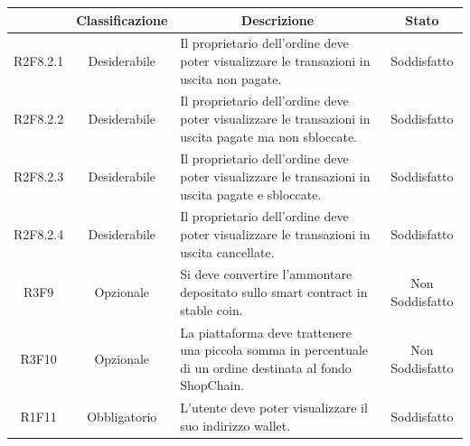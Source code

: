 \begin{table}[H]
    \centering
    \renewcommand{\arraystretch}{1.8}
    \begin{tabular}{c | c | p{6cm} | c}
        \rowcolor[HTML]{125E28}
        \multicolumn{1}{c}{\color[HTML]{FFFFFF} \textbf{Codice}}          &
        \multicolumn{1}{c}{\color[HTML]{FFFFFF} \textbf{Classificazione}} &
        \multicolumn{1}{c}{\color[HTML]{FFFFFF} \textbf{Descrizione}}     &
        \multicolumn{1}{c}{\color[HTML]{FFFFFF} \textbf{Stato}}                                                                                                                                                                  \\
        \hline
        R2F8.2.1                                                          & Desiderabile & Il proprietario dell'ordine deve poter visualizzare le transazioni in uscita non pagate.                   & Soddisfatto                  \\
        R2F8.2.2                                                          & Desiderabile & Il proprietario dell'ordine deve poter visualizzare le transazioni in uscita pagate ma non sbloccate.      & Soddisfatto                  \\
        R2F8.2.3                                                          & Desiderabile & Il proprietario dell'ordine deve poter visualizzare le transazioni in uscita pagate e sbloccate.           & Soddisfatto                  \\
        R2F8.2.4                                                          & Desiderabile & Il proprietario dell'ordine deve poter visualizzare le transazioni in uscita cancellate.                   & Soddisfatto                  \\
        R3F9                                                              & Opzionale    & Si deve convertire l'ammontare depositato sullo smart contract\glo{} in stable coin\glo{}.                 & Non Soddisfatto               \\
        R3F10                                                             & Opzionale    & La piattaforma deve trattenere una piccola somma in percentuale di un ordine destinata al fondo ShopChain. & Non Soddisfatto \\
        R1F11                                                             & Obbligatorio & L'utente deve poter visualizzare il suo indirizzo wallet\glo{}.                                                  & Soddisfatto                      \\

\end{tabular}
\end{table}
